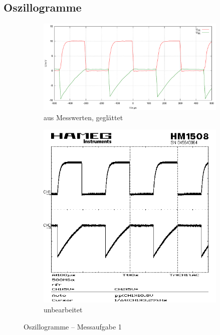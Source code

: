 \documentclass[numbers=noenddot,10pt,a4paper]{scrartcl}
\begin{document}
\subsection{Oszillogramme}
\begin{figure}[H]
\centering
\begin{subfigure}[b]{0.66\textwidth}
\includegraphics[width=\textwidth]{oszillo1.pdf}
\caption{aus Messwerten, geglättet}
\end{subfigure}
\begin{subfigure}[b]{0.33\textwidth}
\includegraphics[width=\textwidth]{SCR00000.png}
\caption{unbearbeitet}
\end{subfigure}
\caption{Oszillogramme -- Messaufgabe 1}
\end{figure}
\end{document}
